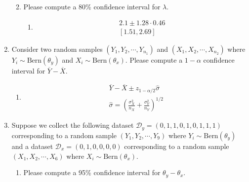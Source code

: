 \documentclass[krantz1,ChapterTOCs]{krantz}
\begin{document}
\begin{enumerate}
\begin{enumerate}
\begin{enumerate}
{            } 
        \end{enumerate}

            \item Please compute a 80\% confidence interval for $\lambda$.
                \begin{enumerate}
            \item {
            \color{red} 
            \begin{align}
                    2.1 \pm 1.28 \cdot   0.46\\ 
                    [1.51, 2.69]
                \end{align}
        
            } 
        \end{enumerate}

        \end{enumerate}

    \item Consider two random samples $(Y_{1},Y_{2},\cdots,Y_{n_{1}})$ and $(X_{1},X_{2},\cdots,X_{n_{2}})$ where $Y_{i} \sim \text{Bern}(\theta_{y})$ and $X_{i} \sim \text{Bern}(\theta_{x})$. Please compute a $1-\alpha$ confidence interval for $\overline{Y} - \overline{X}$.
    
    \begin{enumerate}
        \item {\color{red}
        
        \begin{align}
            \overline{Y} - \overline{X} \pm z_{1-\alpha/2} \hat{\sigma}    \\
            \hat{\sigma} = \left(\frac{\sigma_{X}^{2}}{n_{X}} + \frac{\sigma_{Y}^{2}}{n_{Y}}\right)^{1/2}
        \end{align}
        
        }
    \end{enumerate}
    
    \item Suppose we collect the following dataset $\mathcal{D}_{y} = (0,1,1,0,1,0,1,1,1 )$ corresponding to a random sample $(Y_{1},Y_{2},\cdots,Y_{9})$ where $Y_{i} \sim \text{Bern}(\theta_{y})$ and a dataset $\mathcal{D}_{x} = (0,1,0,0,0,0)$ corresponding to a random sample $(X_{1},X_{2},\cdots,X_{6})$ where $X_{i} \sim \text{Bern}(\theta_{x})$.
    
    
    \begin{enumerate}
        \item Please compute a 95\% confidence interval for $\theta_{y} - \theta_{x}$.
        

\end{enumerate}
\end{enumerate}
\end{document}

